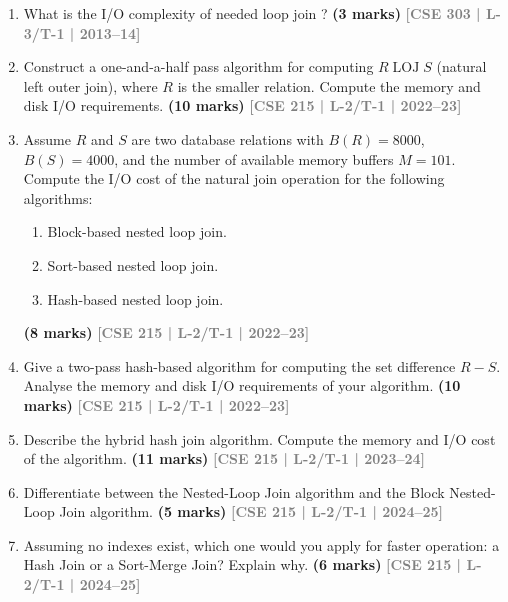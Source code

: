 \documentclass[12pt,a3paper]{article}
\newcommand{\yr}[1]{\hfill\textcolor{gray}{\small\textbf{[#1]}}}
\newcommand{\mk}[1]{\textcolor{orange!70!black}{\small\textbf{(#1 marks)}}}
\begin{document}
\begin{enumerate}

\item What is the I/O complexity of needed loop join ?
\mk{3} \yr{CSE 303 | L-3/T-1 | 2013--14} 

\item Construct a one-and-a-half pass algorithm for computing $R \mathbin{\text{LOJ}} S$ (natural left outer join), where $R$ is the smaller relation. Compute the memory and disk I/O requirements.
\mk{10} \yr{CSE 215 | L-2/T-1 | 2022--23}

\item Assume $R$ and $S$ are two database relations with $B(R) = 8000$, $B(S) = 4000$, and the number of available memory buffers $M = 101$. Compute the I/O cost of the natural join operation for the following algorithms:
\begin{enumerate}
  \item Block-based nested loop join.
  \item Sort-based nested loop join.
  \item Hash-based nested loop join.
\end{enumerate}
\mk{8} \yr{CSE 215 | L-2/T-1 | 2022--23}

\item Give a two-pass hash-based algorithm for computing the set difference $R - S$. Analyse the memory and disk I/O requirements of your algorithm.
\mk{10} \yr{CSE 215 | L-2/T-1 | 2022--23}

\item Describe the hybrid hash join algorithm. Compute the memory and I/O cost of the algorithm.
\mk{11} \yr{CSE 215 | L-2/T-1 | 2023--24}

\item Differentiate between the Nested-Loop Join algorithm and the Block Nested-Loop Join algorithm.
\mk{5} \yr{CSE 215 | L-2/T-1 | 2024--25}

\item Assuming no indexes exist, which one would you apply for faster operation: a Hash Join or a Sort-Merge Join? Explain why.
\mk{6} \yr{CSE 215 | L-2/T-1 | 2024--25}

\end{enumerate}
\end{document}
